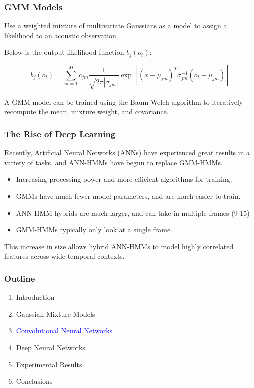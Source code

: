 \documentclass[notes]{beamer}
\begin{document}
\begin{frame}
	\frametitle{GMM Models}
	\begin{center}
		Use a weighted mixture of multivariate Gaussians as a model to assign a likelihood to an acoustic observation.
	\end{center}
	
	\begin{center}
	Below is the output likelihood function $b_{j}(o_{t})$:
	
	\begin{equation*}
	b_{j}(o_{t}) = \sum_{m=1}^{M}c_{jm}\frac{1}{\sqrt{2\pi|\sigma_{jm}|}}\exp[(x-\mu_{jm})^T\sigma_{jm}^{-1}(o_{t}-\mu_{jm})]
	\end{equation*}
	\end{center}
	\begin{center}
		A GMM model can be trained using the Baum-Welch algorithm to iteratively recompute the mean, mixture weight, and covariance.
	\end{center}

\end{frame}

\begin{frame}
	\frametitle{The Rise of Deep Learning}
	\begin{center}
		Recently, Artificial Neural Networks (ANNs) have experienced great results in a variety of tasks, and ANN-HMMs have begun to replace GMM-HMMs.
	\end{center}
	\begin{itemize}
		\item Increasing processing power and more efficient algorithms for training.
		\item GMMs have much fewer model parameters, and are much easier to train.
		\item ANN-HMM hybrids are much larger, and can take in multiple frames (9-15) 
		\item GMM-HMMs typically only look at a single frame.
	\end{itemize}
	
	\begin{center}
		This increase in size allows hybrid ANN-HMMs to model highly correlated features across wide temporal contexts.
	\end{center}
	
\end{frame}

\begin{frame}
	\frametitle{Outline}
	
	\begin{enumerate}
		\item Introduction
		\item Gaussian Mixture Models
		\item \textcolor{blue}{Convolutional Neural Networks}
		\item Deep Neural Networks
		\item Experimental Results
		\item Conclusions
	\end{enumerate}
\end{frame}
\end{document}
